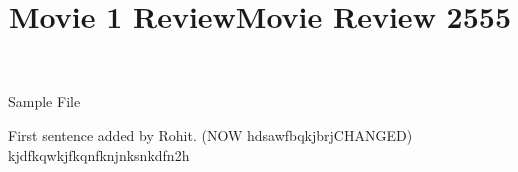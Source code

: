 \documentclass{article}
\begin{document}
\title{Movie 1 Review}


\centerline{\sc \large Sample File}
\vspace{.5pc}
\centerline{\sc }
\vspace{2pc}
\title{Movie Review 2555}

First sentence added by Rohit. (NOW hdsawfbqkjbrjCHANGED)
kjdfkqwkjfkqnfknjnksnkdfn2h
\end{document}
